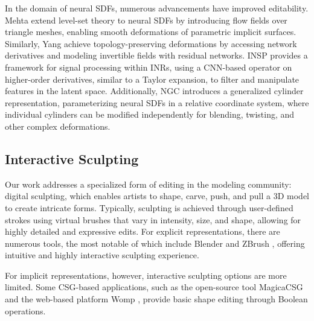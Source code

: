 In the domain of neural SDFs, numerous advancements have improved editability. Mehta \etal \cite{mehta2022level} extend level-set theory to neural SDFs by introducing flow fields over triangle meshes, enabling smooth deformations of parametric implicit surfaces. Similarly, Yang \etal \cite{yang2021geometry} achieve topology-preserving deformations by accessing network derivatives and modeling invertible fields with residual networks. INSP \cite{xu2022signal} provides a framework for signal processing within INRs, using a CNN-based operator on higher-order derivatives, similar to a Taylor expansion, to filter and manipulate features in the latent space. Additionally, NGC \cite{zhu2024controllable} introduces a generalized cylinder representation, parameterizing neural SDFs in a relative coordinate system, where individual cylinders can be modified independently for blending, twisting, and other complex deformations.

\subsection{Interactive Sculpting}
Our work addresses a specialized form of editing in the modeling community: digital sculpting, which enables artists to shape, carve, push, and pull a 3D model to create intricate forms. Typically, sculpting is achieved through user-defined strokes using virtual brushes that vary in intensity, size, and shape, allowing for highly detailed and expressive edits. For explicit representations, there are numerous tools, the most notable of which include Blender \cite{blender} and ZBrush \cite{zbrush}, offering intuitive and highly interactive sculpting experience.

For implicit representations, however, interactive sculpting options are more limited. Some CSG-based applications, such as the open-source tool MagicaCSG \cite{magicacsg} and the web-based platform Womp \cite{womp}, provide basic shape editing through Boolean operations. 

